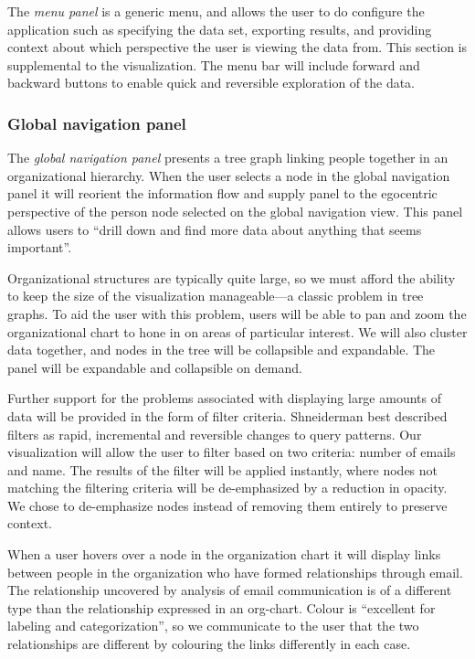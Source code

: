 \documentclass{soups}
\begin{document}
The \emph{menu panel} is a generic menu, and allows the user to do configure the application such as specifying the data set, exporting results, and providing context about which perspective the user is viewing the data from. This section is supplemental to the visualization. The menu bar will include forward and backward buttons to enable quick and reversible exploration of the data.

\subsubsection{Global navigation panel}

The \emph{global navigation panel} presents a tree graph linking people together in an organizational hierarchy. When the user selects a node in the global navigation panel it will reorient the information flow and supply panel to the egocentric perspective of the person node selected on the global navigation view. This panel allows users to “drill down and find more data about anything that seems important”\cite{ware2012information}.

Organizational structures are typically quite large, so we must afford the ability to keep the size of the visualization manageable---a classic problem in tree graphs\cite{herman2000graph}.  To aid the user with this problem, users will be able to pan and zoom the organizational chart to hone in on areas of particular interest. We will also cluster data together, and nodes in the tree will be collapsible and expandable. The panel will be expandable and collapsible on demand.

Further support for the problems associated with displaying large amounts of data will be provided in the form of filter criteria. Shneiderman best described filters as rapid, incremental and reversible changes to query patterns\cite{ahlberg1994visual}. Our visualization will allow the user to filter based on two criteria: number of emails and name. The results of the filter will be applied instantly, where nodes not matching the filtering criteria will be de-emphasized by a reduction in opacity. We chose to de-emphasize nodes instead of removing them entirely to preserve context. 

When a user hovers over a node in the organization chart it will display links between people in the organization who have formed relationships through email. The relationship uncovered by analysis of email communication is of a different type than the relationship expressed in an org-chart. Colour is “excellent for labeling and categorization”\cite{ware2012information}, so we communicate to the user that the two relationships are different by colouring the links differently in each case.
\end{document}
